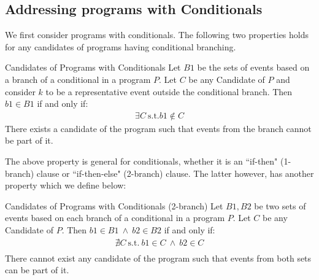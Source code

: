 \subsection{Addressing programs with Conditionals}

        We first consider programs with conditionals. 
        The following two properties holds for any candidates of programs having conditional branching. 
        \begin{property}{Candidates of Programs with Conditionals}
            \label{CondB1}
            Let $B1$ be the sets of events based on a branch of a conditional in a program $P$. 
            Let $C$ be any Candidate of $P$ and consider $k$ to be a representative event outside the conditional branch. 
            Then $b1 \in B1$ if and only if:
            \begin{align*}
                \exists C \ \text{s.t.} b1 \notin C  
            \end{align*}
            There exists a candidate of the program such that events from the branch cannot be part of it\footnotemark. 
        \end{property}


        The above property is general for conditionals, whether it is an ``if-then" (1-branch) clause or ``if-then-else" (2-branch) clause. 
        The latter however, has another property which we define below:
        \begin{property}{Candidates of Programs with Conditionals (2-branch)}
            \label{CondB2}
            Let $B1,B2$ be two sets of events based on each branch of a conditional in a program $P$. 
            Let $C$ be any Candidate of $P$. 
            Then $b1 \in B1 \ \wedge \ b2 \in B2$ if and only if:
            \begin{align*}
                \nexists C \ \text{s.t.} \ b1 \in C \ \wedge \ b2 \in C \\ 
            \end{align*}
            There cannot exist any candidate of the program such that events from both sets can be part of it\footnotemark. 
        \end{property}


